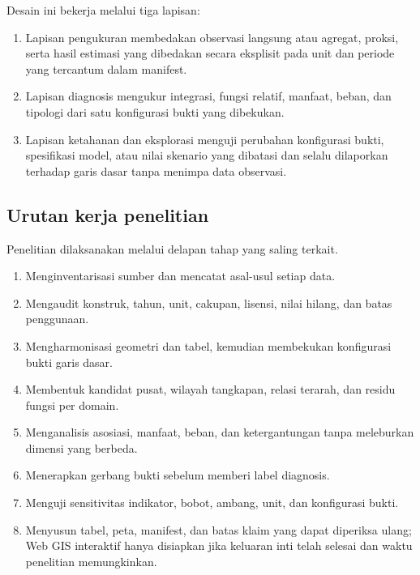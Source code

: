 \documentclass[11pt,a4paper,oneside,openany,indonesian]{report}
\begin{document}
Desain ini bekerja melalui tiga lapisan:

\begin{enumerate}
\def\labelenumi{\arabic{enumi}.}
\tightlist
\item
  Lapisan pengukuran membedakan observasi langsung atau agregat, proksi,
  serta hasil estimasi yang dibedakan secara eksplisit pada unit dan
  periode yang tercantum dalam manifest.
\item
  Lapisan diagnosis mengukur integrasi, fungsi relatif,
  manfaat, beban, dan tipologi dari satu konfigurasi bukti yang
  dibekukan.
\item
  Lapisan ketahanan dan eksplorasi menguji perubahan konfigurasi
  bukti, spesifikasi model, atau nilai skenario yang dibatasi dan selalu
  dilaporkan terhadap garis dasar tanpa menimpa data observasi.
\end{enumerate}

\subsection{Urutan kerja
penelitian}\label{urutan-kerja-penelitian}

Penelitian dilaksanakan melalui delapan tahap yang saling terkait.

\begin{enumerate}
\def\labelenumi{\arabic{enumi}.}
\tightlist
\item
  Menginventarisasi sumber dan mencatat asal-usul setiap data.
\item
  Mengaudit konstruk, tahun, unit, cakupan, lisensi, nilai hilang, dan
  batas penggunaan.
\item
  Mengharmonisasi geometri dan tabel, kemudian membekukan konfigurasi
  bukti garis dasar.
\item
  Membentuk kandidat pusat, wilayah tangkapan, relasi terarah, dan
  residu fungsi per domain.
\item
  Menganalisis asosiasi, manfaat, beban, dan ketergantungan tanpa
  meleburkan dimensi yang berbeda.
\item
  Menerapkan gerbang bukti sebelum memberi label diagnosis.
\item
  Menguji sensitivitas indikator, bobot, ambang, unit, dan konfigurasi
  bukti.
\item
  Menyusun tabel, peta, manifest, dan batas klaim yang dapat diperiksa
  ulang; Web GIS interaktif hanya disiapkan jika keluaran inti telah
  selesai dan waktu penelitian memungkinkan.
\end{enumerate}
\end{document}

